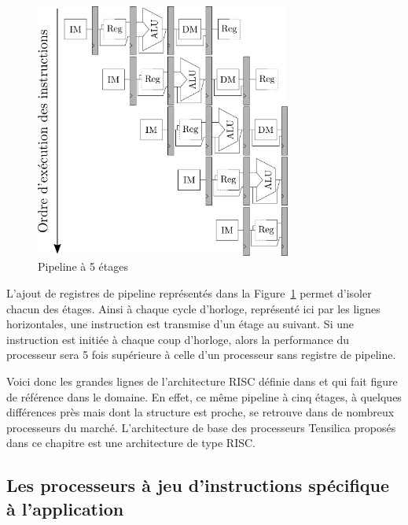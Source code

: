 \begin{figure}[t]
\centering
\includegraphics[width=0.75\textwidth]{main/ch3_fig/pipelines}
\caption{Pipeline à 5 étages}
\label{fig:pipelines}
\end{figure}


L'ajout de registres de pipeline représentés dans la Figure~\ref{fig:pipelines} permet d'isoler chacun des étages. Ainsi à chaque cycle d'horloge, représenté ici par les lignes horizontales, une instruction est transmise d'un étage au suivant. Si une instruction est initiée à chaque coup d'horloge, alors la performance du processeur sera 5 fois supérieure à celle d'un processeur sans registre de pipeline.

Voici donc les grandes lignes de l'architecture RISC définie dans \cite{hennessy2011computer} et qui fait figure de référence dans le domaine. En effet, ce même pipeline à cinq étages, à quelques différences près mais dont la structure est proche, se retrouve dans de nombreux processeurs du marché. L'architecture de base des processeurs Tensilica proposés dans ce chapitre est une architecture de type RISC.

\subsection{Les processeurs à jeu d'instructions spécifique à l'application}

